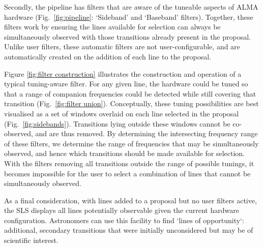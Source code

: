 \documentclass[11pt,twoside]{article}
\begin{document}
Secondly, the pipeline has filters that are aware of the tuneable aspects of ALMA hardware (Fig.~\ref{fig:pipeline}: `Sideband' and `Baseband' filters). Together, these filters work by ensuring the lines available for selection can always be simultaneously observed with those transitions already present in the proposal. Unlike user filters, these automatic filters are not user-configurable, and are automatically created on the addition of each line to the proposal. 

Figure \ref{fig:filter construction} illustrates the construction and operation of a typical tuning-aware filter. For any given line, the hardware could be tuned so that a range of companion frequencies could be detected while still covering that transition (Fig.~\ref{fig:filter union}). Conceptually, these tuning possibilities are best visualised as a set of windows overlaid on each line selected in the proposal (Fig.~\ref{fig:sidebands}). Transitions lying outside these windows cannot be co-observed, and are thus removed. By determining the intersecting frequency range of these filters, we determine the range of frequencies that may be simultaneously observed, and hence which transitions should be made available for selection. With the filters removing all transitions outside the range of possible tunings, it becomes impossible for the user to select a combination of lines that cannot be simultaneously observed.

As a final consideration, with lines added to a proposal but no user filters active, the SLS displays all lines potentially observable given the current hardware configuration. Astronomers can use this facility to find `lines of opportunity`: additional, secondary transitions that were initially unconsidered but may be of scientific interest.
\end{document}
